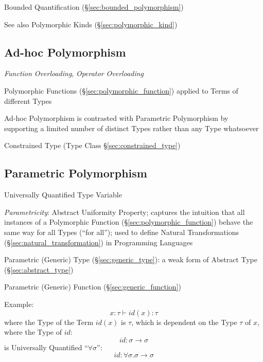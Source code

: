 Bounded Quantification (\S\ref{sec:bounded_polymorphism})

\fist See also Polymorphic Kinds (\S\ref{sec:polymorphic_kind})



\subsection{Ad-hoc Polymorphism}\label{sec:adhoc_polymorphism}

\emph{Function Overloading}, \emph{Operator Overloading}

Polymorphic Functions (\S\ref{sec:polymorphic_function}) applied to
Terms of different Types

Ad-hoc Polymorphism is contrasted with Parametric Polymorphism by
supporting a limited number of distinct Types rather than any Type
whatsoever

Constrained Type (Type Class \S\ref{sec:constrained_type})



\subsection{Parametric Polymorphism}\label{sec:parametric_polymorphism}

Universally Quantified Type Variable

\emph{Parametricity}: Abstract Uniformity Property; captures the
intuition that all instances of a Polymorphic Function
(\S\ref{sec:polymorphic_function}) behave the same way for all Types
(``for all''); used to define Natural Transformations
(\S\ref{sec:natural_transformation}) in Programming Languages

Parametric (Generic) Type (\S\ref{sec:generic_type}): a weak form of
Abstract Type (\S\ref{sec:abstract_type})

Parametric (Generic) Function (\S\ref{sec:generic_function})

Example:
\[
  x:\tau \vdash id(x):\tau
\]
where the Type of the Term $id(x)$ is $\tau$, which is dependent on
the Type $\tau$ of $x$, where the Type of $id$:
\[
  id:\sigma \rightarrow \sigma
\]
is Universally Quantified ``$\forall \sigma$'':
\[
  id:\forall \sigma.\sigma \rightarrow \sigma
\]


